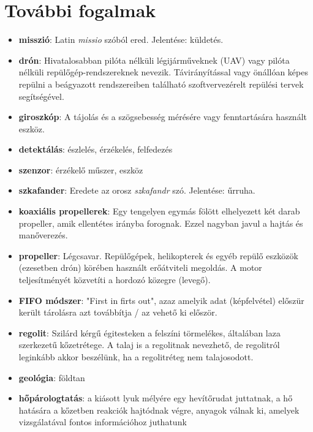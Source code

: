 \documentclass[12pt]{report}
\begin{document}
\section{További fogalmak}

\begin{itemize}

  \item \textbf{misszió}: Latin \textit{missio} szóból ered. Jelentése: küldetés.
  \item \textbf{drón}: Hivatalosabban pilóta nélküli légijárműveknek (UAV) vagy pilóta nélküli repülőgép-rendszereknek nevezik. Távirányítással vagy önállóan képes repülni a beágyazott rendszereiben található szoftvervezérelt repülési tervek segítségével.
  \item \textbf{giroszkóp}: A tájolás és a szögsebesség mérésére vagy fenntartására használt eszköz.
  \item \textbf{detektálás}: észlelés, érzékelés, felfedezés
  \item \textbf{szenzor}: érzékelő műszer, eszköz
  \item \textbf{szkafander}: Eredete az orosz \textit{szkafandr} szó. Jelentése: űrruha.
  \item \textbf{koaxiális propellerek}: Egy tengelyen egymás fölött elhelyezett két darab propeller, amik ellentétes irányba forognak. Ezzel nagyban javul a hajtás és manőverezés.
  \item \textbf{propeller}: Légcsavar. Repülőgépek, helikopterek és egyéb repülő eszközök (ezesetben drón) körében használt erőátviteli megoldás. A motor teljesítményét közvetíti a hordozó közegre (levegő).
  \item \textbf{FIFO módszer}: "First in firts out", azaz amelyik adat (képfelvétel) előszür került tárolásra azt továbbítja / az vehető ki először.
  \item \textbf{regolit}: Szilárd kérgű égitesteken a felszíni törmelékes, általában laza szerkezetű kőzetrétege. A talaj is a regolitnak nevezhető, de regolitról leginkább akkor beszélünk, ha a regolitréteg nem talajosodott.
  \item \textbf{geológia}: földtan
  \item \textbf{hőpárologtatás}: a kiásott lyuk mélyére egy hevítőrudat juttatnak, a hő hatására a kőzetben reakciók hajtódnak végre, anyagok válnak ki, amelyek vizsgálatával fontos információhoz juthatunk

\end{itemize}
\end{document}

